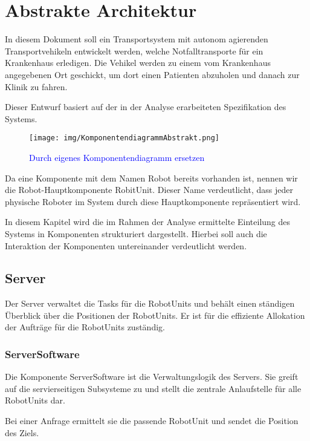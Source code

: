 \section{Abstrakte Architektur}
In diesem Dokument soll ein Transportsystem mit autonom agierenden Transportvehikeln entwickelt werden, welche Notfalltransporte f\"{u}r ein Krankenhaus erledigen. Die Vehikel werden zu einem vom Krankenhaus angegebenen Ort geschickt, um dort einen Patienten abzuholen und danach zur Klinik zu fahren. 

Dieser Entwurf basiert auf der in der Analyse erarbeiteten Spezifikation des Systems.

\begin{figure}[H]
\centering
\texttt{[image: img/KomponentendiagrammAbstrakt.png]}
\caption{\textcolor{blue}{Durch eigenes Komponentendiagramm ersetzen}}
\label{KomponentendiagrammAbstrakt}
\end{figure}

Da eine Komponente mit dem Namen Robot bereits vorhanden ist, nennen wir die Robot-Hauptkomponente RobitUnit. Dieser Name verdeutlicht, dass jeder physische Roboter im System durch diese Hauptkomponente repr\"{a}sentiert wird.

In diesem Kapitel wird die im Rahmen der Analyse ermittelte Einteilung des Systems in Komponenten strukturiert dargestellt. Hierbei soll auch die Interaktion der Komponenten untereinander verdeutlicht werden.

\subsection{Server}

Der Server verwaltet die Tasks f\"{u}r die RobotUnits und beh\"{a}lt einen st\"{a}ndigen \"{U}berblick \"{u}ber die Positionen der RobotUnits. Er ist f\"{u}r die effiziente Allokation der Auftr\"{a}ge f\"{u}r die RobotUnits zust\"{a}ndig.

\subsubsection{ServerSoftware}

Die Komponente ServerSoftware ist die Verwaltungslogik des Servers. Sie greift auf die servierseitigen Subsysteme zu und stellt die zentrale Anlaufstelle f\"{u}r alle RobotUnits dar. 

Bei einer Anfrage ermittelt sie die passende RobotUnit und sendet die Position des Ziels. 

